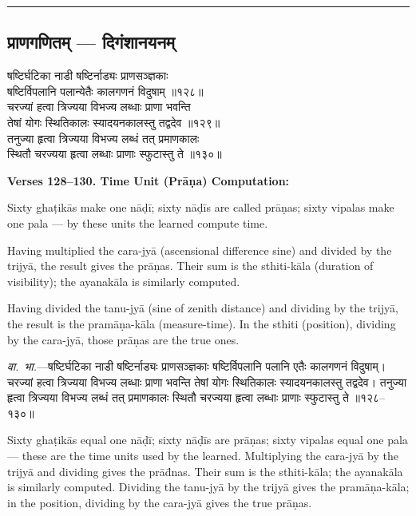 \documentclass[11pt,a4paper]{article}
\newcommand{\longline}{\noindent\rule{\textwidth}{0.4pt}}
\newcommand{\dev}[1]{{\devanagarifont #1}}
\newcommand{\sectsep}{\par\vspace{0.8em}\longline\vspace{0.8em}}
\begin{document}
\sectsep

\subsection{\dev{प्राणगणितम् --- दिगंशानयनम्}}

\begin{minipage}[t]{0.48\textwidth}
\small\devanagarifont
षष्टिर्घटिका नाडी षष्टिर्नाड्यः प्राणसञ्ज्ञकाः\\
षष्टिर्विपलानि पलान्येतैः कालगणनं विदुषाम् ॥१२८॥\\[0.5em]
चरज्यां हत्वा त्रिज्यया विभज्य लब्धाः प्राणा भवन्ति\\
तेषां योगः स्थितिकालः स्यादयनकालस्तु तद्वदेव ॥१२९॥\\[0.5em]
तनुज्या हृत्वा त्रिज्यया विभज्य लब्धं तत् प्रमाणकालः\\
स्थितौ चरज्यया हृत्वा लब्धाः प्राणाः स्फुटास्तु ते ॥१३०॥
\end{minipage}%
\hfill
\begin{minipage}[t]{0.48\textwidth}
\small
\textbf{Verses 128--130. Time Unit (Pr\=a\d{n}a) Computation:}

Sixty gha\d{t}ik\=as make one n\=a\d{d}\=i; sixty n\=a\d{d}\=is are called pr\=a\d{n}as; sixty vipalas make one pala --- by these units the learned compute time.

Having multiplied the cara-jy\=a (ascensional difference sine) and divided by the trijy\=a, the result gives the pr\=a\d{n}as. Their sum is the sthiti-k\=ala (duration of visibility); the ayanak\=ala is similarly computed.

Having divided the tanu-jy\=a (sine of zenith distance) and dividing by the trijy\=a, the result is the pram\=a\d{n}a-k\=ala (measure-time). In the sthiti (position), dividing by the cara-jy\=a, those pr\=a\d{n}as are the true ones.
\end{minipage}

\vspace{0.5em}
\begin{minipage}[t]{0.48\textwidth}
\small\devanagarifont
\textit{वा.~भा.}---षष्टिर्घटिका नाडी षष्टिर्नाड्यः प्राणसञ्ज्ञकाः षष्टिर्विपलानि पलानि एतैः कालगणनं विदुषाम्। चरज्यां हत्वा त्रिज्यया विभज्य लब्धाः प्राणा भवन्ति तेषां योगः स्थितिकालः स्यादयनकालस्तु तद्वदेव। तनुज्या हृत्वा त्रिज्यया विभज्य लब्धं तत् प्रमाणकालः स्थितौ चरज्यया हृत्वा लब्धाः प्राणाः स्फुटास्तु ते ॥१२८--१३०॥
\end{minipage}%
\hfill
\begin{minipage}[t]{0.48\textwidth}
\small
Sixty gha\d{t}ik\=as equal one n\=a\d{d}\=i; sixty n\=a\d{d}\=is are pr\=a\d{n}as; sixty vipalas equal one pala --- these are the time units used by the learned. Multiplying the cara-jy\=a by the trijy\=a and dividing gives the pr\=a\=d{n}as. Their sum is the sthiti-k\=ala; the ayanak\=ala is similarly computed. Dividing the tanu-jy\=a by the trijy\=a gives the pram\=a\d{n}a-k\=ala; in the position, dividing by the cara-jy\=a gives the true pr\=a\d{n}as.
\end{minipage}
\end{document}

